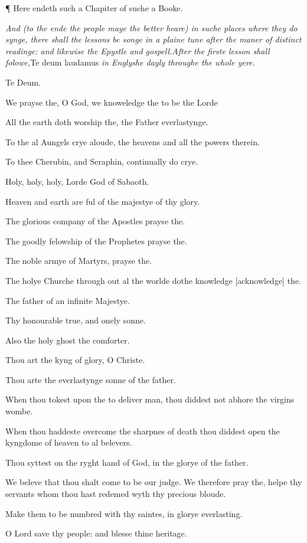 ¶
Here endeth such a Chapiter of suche a Booke.

\emph{And (to the ende the people maye the better heare) in suche places where
they do synge, there shall the lessons be songe in a plaine tune after
the maner of distinct readinge: and likewise the Epystle and gospell.}\emph{After the firste lesson
shall folowe,}Te
deum laudamus \emph{in Englyshe dayly throughe the whole yere.}

Te
Deum.

We prayse the, O God, we knoweledge the to be the Lorde

All the earth doth worship the, the Father everlastynge.

To the al Aungels crye aloude, the heavens and all
the powers therein.

To thee Cherubin, and Seraphin, continually do crye.

Holy, holy, holy, Lorde God of Sabaoth.

Heaven and earth are ful of the majestye of thy glory.

The glorious company of the Apostles prayse the.

The goodly felowship of the Prophetes prayse the.

The noble armye of Martyrs, prayse the.

The holye Churche through out al the worlde dothe knowledge
[acknowledge] the.

The father of an infinite Majestye.

Thy honourable true, and onely sonne.

Also the holy ghost the comforter.

Thou art the kyng of glory, O Christe.

Thou arte the everlastynge sonne of the father.

When thou tokest upon the to deliver man, thou diddest
not abhore the virgins wombe.

When thou haddeste overcome the sharpnes of death thou
diddest open the kyngdome of heaven to al belevers.

Thou syttest on the ryght hand of God, in the glorye
of the father.

We beleve that thou shalt come to be our judge. We
therefore pray the, helpe thy servants whom thou hast redemed wyth thy
precious bloude.

Make them to be numbred with thy saintes, in glorye
everlasting.

O Lord save thy people: and blesse thine heritage.

